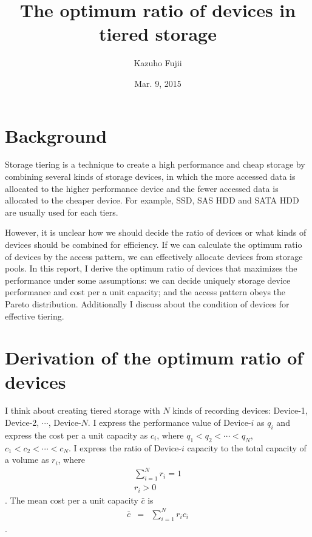 \documentclass[a4paper,11pt]{article}
\title{The optimum ratio of devices in tiered storage}
\author{Kazuho Fujii}
\date{Mar. 9, 2015}
\begin{document}
\maketitle

\section{Background}
Storage tiering is a technique to create a high performance and cheap storage by combining several kinds of storage devices,
in which the more accessed data is allocated to the higher performance device and the fewer accessed data is allocated to the cheaper device.
For example, SSD, SAS HDD and SATA HDD are usually used for each tiers.

However, it is unclear how we should decide the ratio of devices or what kinds of devices should be combined for efficiency.
If we can calculate the optimum ratio of devices by the access pattern, we can effectively allocate devices from storage pools.
In this report, I derive the optimum ratio of devices that maximizes the performance under some assumptions:
we can decide uniquely storage device performance and cost per a unit capacity;
and the access pattern obeys the Pareto distribution. Additionally I discuss about the condition of devices for effective tiering.

\section{Derivation of the optimum ratio of devices}

I think about creating tiered storage with $N$ kinds of recording devices: Device-1, Device-2, $\cdots$, Device-$N$.
I express the performance value of Device-$i$ as $q_i$ and express the cost per a unit capacity as $c_i$, where  $q_1<q_2<\cdots<q_N$, $c_1<c_2<\cdots<c_N$.
I express the ratio of Device-$i$ capacity to the total capacity of a volume as $r_i$, where
\begin{eqnarray}
\sum_{i=1}^N r_i = 1 \label{sum_ratio}\\
r_i > 0
\end{eqnarray}
. The mean cost per a unit capacity $\bar{c}$ is
\begin{eqnarray}
\bar{c}&=&\sum_{i=1}^N r_i c_i \label{mean_cost}
\end{eqnarray}
.
\end{document}
